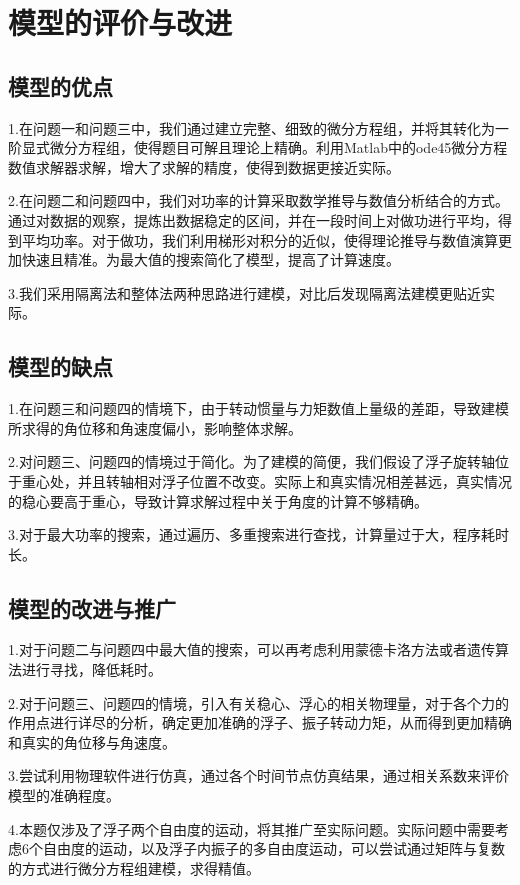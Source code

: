 \documentclass{article}
\numberwithin{equation}{subsection}
\begin{document}
{\centering\section{模型的评价与改进}}
\subsection{模型的优点}
1.在问题一和问题三中，我们通过建立完整、细致的微分方程组，并将其转化为一阶显式微分方程组，使得题目可解且理论上精确。利用Matlab中的ode45微分方程数值求解器求解，增大了求解的精度，使得到数据更接近实际。

2.在问题二和问题四中，我们对功率的计算采取数学推导与数值分析结合的方式。通过对数据的观察，提炼出数据稳定的区间，并在一段时间上对做功进行平均，得到平均功率。对于做功，我们利用梯形对积分的近似，使得理论推导与数值演算更加快速且精准。为最大值的搜索简化了模型，提高了计算速度。

3.我们采用隔离法和整体法两种思路进行建模，对比后发现隔离法建模更贴近实际。
\subsection{模型的缺点}
1.在问题三和问题四的情境下，由于转动惯量与力矩数值上量级的差距，导致建模所求得的角位移和角速度偏小，影响整体求解。

2.对问题三、问题四的情境过于简化。为了建模的简便，我们假设了浮子旋转轴位于重心处，并且转轴相对浮子位置不改变。实际上和真实情况相差甚远，真实情况的稳心要高于重心，导致计算求解过程中关于角度的计算不够精确。

3.对于最大功率的搜索，通过遍历、多重搜索进行查找，计算量过于大，程序耗时长。
\subsection{模型的改进与推广}
1.对于问题二与问题四中最大值的搜索，可以再考虑利用蒙德卡洛方法或者遗传算法进行寻找，降低耗时。

2.对于问题三、问题四的情境，引入有关稳心、浮心的相关物理量，对于各个力的作用点进行详尽的分析，确定更加准确的浮子、振子转动力矩，从而得到更加精确和真实的角位移与角速度。

3.尝试利用物理软件进行仿真，通过各个时间节点仿真结果，通过相关系数来评价模型的准确程度。

4.本题仅涉及了浮子两个自由度的运动，将其推广至实际问题。实际问题中需要考虑6个自由度的运动，以及浮子内振子的多自由度运动，可以尝试通过矩阵与复数的方式进行微分方程组建模，求得精值。
\end{document}
